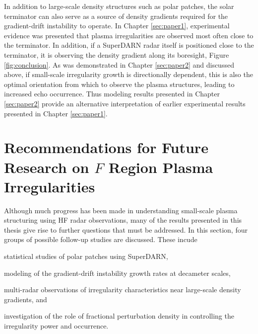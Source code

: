 In addition to large-scale density structures such as polar patches, the solar terminator can also serve as a source of density gradients required for the gradient-drift instability to operate.  In Chapter \ref{sec:paper1}, experimental evidence was presented that plasma irregularities are observed most often close to the terminator.  In addition, if a SuperDARN radar itself is positioned close to the terminator, it is observing the density gradient along its boresight, Figure \ref{fig:conclusion}.  As was demonstrated in Chapter \ref{sec:paper2} and discussed above, if small-scale irregularity growth is directionally dependent, this is also the optimal orientation from which to observe the plasma structures, leading to increased echo occurrence.  Thus modeling results presented in Chapter \ref{sec:paper2} provide an alternative interpretation of earlier experimental results presented in Chapter \ref{sec:paper1}.


\section{Recommendations for Future Research on \(F\) Region Plasma Irregularities}
\label{sec:futurework}

Although much progress has been made in understanding small-scale plasma structuring using HF radar observations, many of the results presented in this thesis give rise to further questions that must be addressed.  In this section, four groups of possible follow-up studies are discussed.  These incude 
\begin{enumerate*}[label={(\arabic*)}] 
	\item statistical studies of polar patches using SuperDARN, 
	\item modeling of the gradient-drift instability growth rates at decameter scales, 
	\item multi-radar observations of irregularity characteristics near large-scale density gradients, and 
	\item investigation of the role of fractional perturbation density in controlling the irregularity power and occurrence.
\end{enumerate*}

